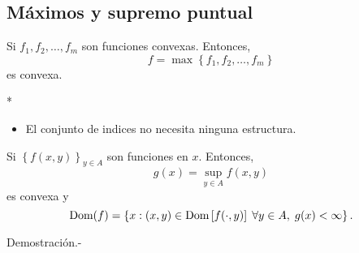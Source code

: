 \begin{paracol}{2}
\subsection{Máximos y supremo puntual}

\begin{teo} Si $f_1,f_2,\ldots,f_m$ son funciones convexas. Entonces,
    $$f=\max\left\{f_1,f_2,\ldots,f_m\right\}$$ 
    es convexa.
\end{teo}

\switchcolumn[1]*{\noindent\scriptsize
	\begin{itemize}
	    \item El conjunto de indices no necesita ninguna estructura.
	\end{itemize}
}
\switchcolumn[0]\noindent
\begin{teo} Si $\left\{f(x,y)\right\}_{y\in A}$ son funciones en $x$. Entonces,
    $$g(x)=\sup_{y\in A}f(x,y)$$
    es convexa y 
    $$\mathop{\mbox{\normalfont Dom}}\nolimits(f)=\left\{x:(x,y)\in \mathop{\mbox{\normalfont Dom}}\nolimits\left[f(\cdot,y)\right]\;\forall y\in A,\; g(x)<\infty\right\}.$$

    Demostración.-\; 

\end{teo}

\end{paracol}
